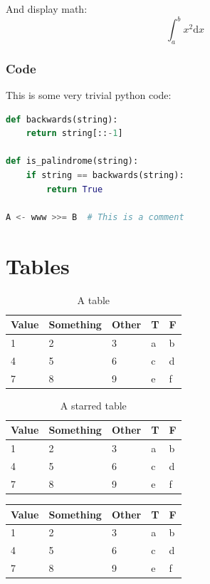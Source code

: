 \documentclass{jcls}
\begin{document}
And display math:
\[
  \int_a^b x^2  \mathrm{d} x
\]

\subsubsection{Code}

This is some very trivial python code:

\begin{lstlisting}[language=Python]
def backwards(string):
    return string[::-1]

def is_palindrome(string):
    if string == backwards(string): 
		return True

A <- www >>= B  # This is a comment
\end{lstlisting}

\section{Tables}

\begin{table}[ht]
  \begin{tabular}{@{}lllll@{}}
    Value & Something & Other & T & F \\ \midrule
    1     & 2         & 3     & a & b \\
    4     & 5         & 6     & c & d \\
    7     & 8         & 9     & e & f \\
  \end{tabular}
  \caption{A table}
\end{table}

\begin{table}
  \begin{tabular}{@{}lllll@{}}
    Value & Something & Other & T & F \\ \midrule
    1     & 2         & 3     & a & b \\
    4     & 5         & 6     & c & d \\
    7     & 8         & 9     & e & f \\
  \end{tabular}
  \caption{A starred table}
\end{table}

\begin{fullwidthtable}
  \begin{tabular}{@{}lllll@{}}
    Value & Something & Other & T & F \\ \midrule
    1     & 2         & 3     & a & b \\
    4     & 5         & 6     & c & d \\
    7     & 8         & 9     & e & f \\
  \end{tabular}
  \caption{A fullwidth table}
\end{fullwidthtable}
\end{document}

